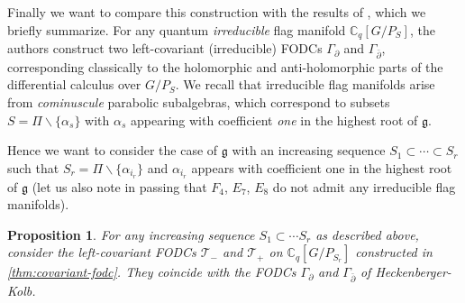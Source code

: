 \documentclass[a4paper, 12pt, reqno, english]{amsart}
\numberwithin{equation}{section}
\numberwithin{figure}{section}
\theoremstyle{plain}
\theoremstyle{plain}
\theoremstyle{plain}
\newtheorem{proposition}[theorem]{Proposition}
\theoremstyle{plain}
\theoremstyle{plain}
\theoremstyle{definition}
\theoremstyle{definition}
\theoremstyle{definition}
\theoremstyle{remark}
\theoremstyle{definition}
\theoremstyle{definition}
\newcommand{\bbC}{\mathbb{C}}
\newcommand{\lieg}{\mathfrak{g}}
\newcommand{\simpleroots}{\Pi}
\newcommand{\del}{\partial}
\newcommand{\delbar}{\bar{\partial}}
\newcommand{\tang}{\mathcal{T}}
\begin{document}
Finally we want to compare this construction with the results of \cite{heko}, which we briefly summarize.
For any quantum \emph{irreducible} flag manifold $\bbC_q[G / P_S]$, the authors construct two left-covariant (irreducible) FODCs $\Gamma_\del$ and $\Gamma_{\delbar}$, corresponding classically to the holomorphic and anti-holomorphic parts of the differential calculus over $G / P_S$.
We recall that irreducible flag manifolds arise from \emph{cominuscule} parabolic subalgebras, which correspond to subsets $S = \simpleroots \backslash \{\alpha_s\}$ with $\alpha_s$ appearing with coefficient \emph{one} in the highest root of $\lieg$.

Hence we want to consider the case of $\lieg$ with an increasing sequence $S_1 \subset \cdots \subset S_r$ such that $S_r = \simpleroots \backslash \{\alpha_{i_r}\}$ and $\alpha_{i_r}$ appears with coefficient one in the highest root of $\lieg$ (let us also note in passing that $F_4$, $E_7$, $E_8$ do not admit any irreducible flag manifolds).

\begin{proposition}
\label{prop:comparison-heckenberger-kolb}
For any increasing sequence $S_1 \subset \cdots S_r$ as described above, consider the left-covariant FODCs $\tang_-$ and $\tang_+$ on $\bbC_q[G / P_{S_r}]$ constructed in \cref{thm:covariant-fodc}.
They coincide with the FODCs $\Gamma_\del$ and $\Gamma_{\delbar}$ of Heckenberger-Kolb.
\end{proposition}
\end{document}
